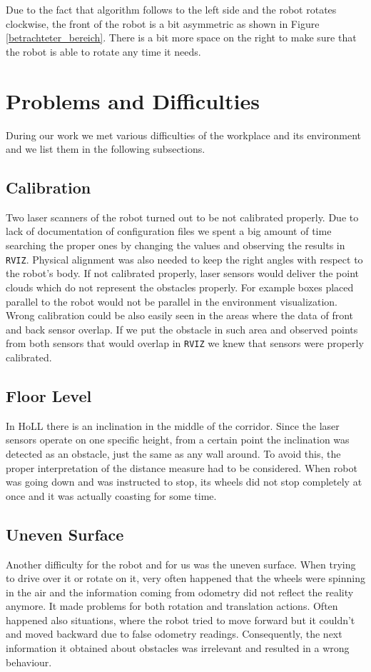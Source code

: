 Due to the fact that algorithm follows to the left side and the robot rotates clockwise, the front of the robot is a bit asymmetric as shown in Figure \ref{betrachteter_bereich}. There is a bit more space on the right to make sure that the robot is able to rotate any time it needs.

\section{Problems and Difficulties} \label{problems}
During our work we met various difficulties of the workplace and its environment and we list them in the following subsections.

\subsection{Calibration}
Two laser scanners of the robot turned out to be not calibrated properly. Due to lack of documentation of configuration files we spent a big amount of time searching the proper ones by changing the values and observing the results in \texttt{RVIZ}. Physical alignment was also needed to keep the right angles with respect to the robot's body. If not calibrated properly, laser sensors would deliver the point clouds which do not represent the obstacles properly. For example boxes placed parallel to the robot would not be parallel in the environment visualization. Wrong calibration could be also easily seen in the areas where the data of front and back sensor overlap. If we put the obstacle in such area and observed points from both sensors that would overlap in \texttt{RVIZ} we knew that sensors were properly calibrated.

\subsection{Floor Level}
In HoLL there is an inclination in the middle of the corridor. Since the laser sensors operate on one specific height, from a certain point the inclination was detected as an obstacle, just the same as any wall around. To avoid this, the proper interpretation of the distance measure had to be considered.
When robot was going down and was instructed to stop, its wheels did not stop completely at once and it was actually coasting for some time.

\subsection{Uneven Surface}
Another difficulty for the robot and for us was the uneven surface. When trying to drive over it or rotate on it, very often happened that the wheels were spinning in the air and the information coming from odometry did not reflect the reality anymore. It made problems for both rotation and translation actions. Often happened also situations, where the robot tried to move forward but it couldn't and moved backward due to false odometry readings. Consequently, the next information it obtained about obstacles was irrelevant and resulted in a wrong behaviour.

